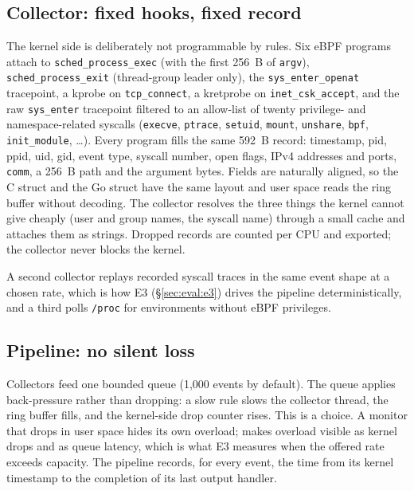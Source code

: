 \subsection{Collector: fixed hooks, fixed record}
\label{sec:design:collector}
{\sloppy
The kernel side is deliberately not programmable by rules. Six eBPF programs
attach to \texttt{sched\_process\_exec} (with the first \SI{256}{B} of
\texttt{argv}), \texttt{sched\_process\_exit} (thread-group leader only),
the \texttt{sys\_enter\_openat} tracepoint, a kprobe on
\texttt{tcp\_connect}, a kretprobe on \texttt{inet\_csk\_accept}, and the
raw \texttt{sys\_enter} tracepoint filtered to an allow-list of twenty
privilege- and namespace-related syscalls (\texttt{execve},
\texttt{ptrace}, \texttt{setuid}, \texttt{mount}, \texttt{unshare},
\texttt{bpf}, \texttt{init\_module}, \ldots). Every program fills the same
\SI{592}{B} record: timestamp, pid, ppid, uid, gid, event type, syscall
number, open flags, IPv4 addresses and ports, \texttt{comm}, a
\SI{256}{B} path and the argument bytes. Fields are naturally aligned, so
the C struct and the Go struct have the same layout and user space reads
the ring buffer without decoding. The collector resolves the three things
the kernel cannot give cheaply (user and group names, the syscall name)
through a small cache and attaches them as strings. Dropped records are
counted per CPU and exported; the collector never blocks the kernel.\par}

A second collector replays recorded syscall traces in the same event
shape at a chosen rate, which is how E3 (\S\ref{sec:eval:e3}) drives the
pipeline deterministically, and a third polls \texttt{/proc} for
environments without eBPF privileges.

\subsection{Pipeline: no silent loss}
\label{sec:design:pipeline}
Collectors feed one bounded queue (1,000 events by default). The queue
applies back-pressure rather than dropping: a slow rule slows the collector
thread, the ring buffer fills, and the kernel-side drop counter rises. This
is a choice. A monitor that drops in user space hides its own overload;
\sys makes overload visible as kernel drops and as queue latency, which is
what E3 measures when the offered rate exceeds capacity. The pipeline
records, for every event, the time from its kernel timestamp to the
completion of its last output handler.

